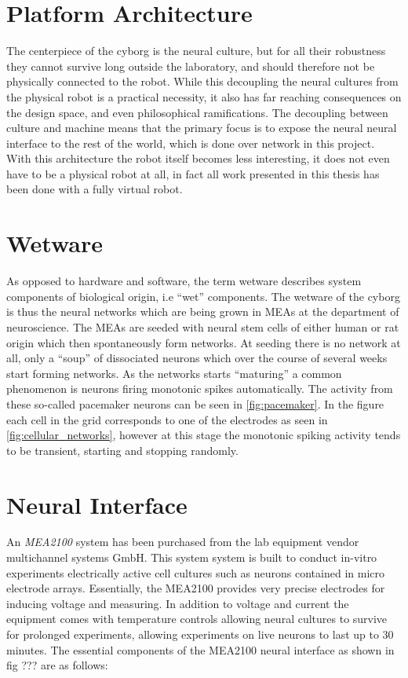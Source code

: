 \section{Platform Architecture}
The centerpiece of the cyborg is the neural culture, but for all their
robustness they cannot survive long outside the laboratory, and should therefore
not be physically connected to the robot.
While this decoupling the neural cultures from the physical robot is a practical
necessity, it also has far reaching consequences on the design space, and even
philosophical ramifications.
The decoupling between culture and machine means that the primary focus is to
expose the neural neural interface to the rest of the world, which is done over
network in this project.
With this architecture the robot itself becomes less interesting, it does not
even have to be a physical robot at all, in fact all work presented in this
thesis has been done with a fully virtual robot.
\section{Wetware}
As opposed to hardware and software, the term wetware describes system
components of biological origin, i.e ``wet'' components.
The wetware of the cyborg is thus the neural networks which are being grown in
MEAs at the department of neuroscience.
The MEAs are seeded with neural stem cells of either human or rat origin which
then spontaneously form networks.
At seeding there is no network at all, only a ``soup'' of dissociated
neurons which over the course of several weeks start forming networks.
As the networks starts ``maturing'' a common phenomenon is neurons firing
monotonic spikes automatically.
The activity from these so-called pacemaker neurons can be seen in
\ref{fig:pacemaker}.
In the figure each cell in the grid corresponds to one of the
electrodes as seen in \ref{fig:cellular_networks}, however at this stage the
monotonic spiking activity tends to be transient, starting and stopping
randomly.

\section{Neural Interface}
An \textit{MEA2100} system has been purchased from the lab equipment vendor
multichannel systems GmbH.
This system system is built to conduct in-vitro experiments electrically active
cell cultures such as neurons contained in micro electrode arrays.
Essentially, the MEA2100 provides very precise electrodes for inducing voltage
and measuring.
In addition to voltage and current the equipment comes with temperature controls
allowing neural cultures to survive for prolonged experiments, allowing
experiments on live neurons to last up to 30 minutes.
The essential components of the MEA2100 neural interface as shown in fig ??? are
as follows:

